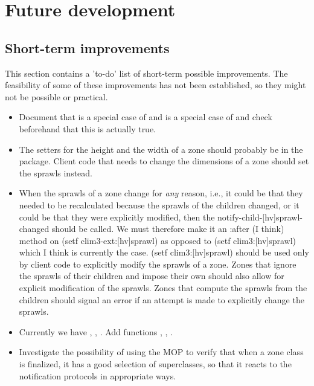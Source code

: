 \chapter{Future development}

\section{Short-term improvements}

This section contains a 'to-do' list of short-term possible
improvements.  The feasibility of some of these improvements has not
been established, so they might not be possible or practical. 

\begin{itemize}
\item Document that  is a special case of 
  and  is a  special case of  and check
  beforehand that this is actually true. 

\item The setters for the height and the width of a zone should
  probably be in the  package.  Client code that needs
  to change the dimensions of a zone should set the sprawls instead. 

\item When the sprawls of a zone change for \emph{any} reason, i.e.,
  it could be that they needed to be recalculated because the sprawls
  of the children changed, or it could be that they were explicitly
  modified, then the notify-child-[hv]sprawl-changed should be
  called.  We must therefore make it an :after (I think) method on
  (setf clim3-ext:[hv]sprawl) as opposed to (setf clim3:[hv]sprawl)
  which I think is currently the case.  (setf clim3:[hv]sprawl) should
  be used only by client code to explicitly modify the sprawls of a
  zone.  Zones that ignore the sprawls of their children and impose
  their own should also allow for explicit modification of the
  sprawls.  Zones that compute the sprawls from the children should
  signal an error if an attempt is made to explicitly change the
  sprawls. 

\item Currently we have , ,
  .  Add functions 
  , ,
  .

\item Investigate the possibility of using the MOP to verify that when
  a zone class is finalized, it has a good selection of superclasses,
  so that it reacts to the notification protocols in appropriate ways.


\end{itemize}

